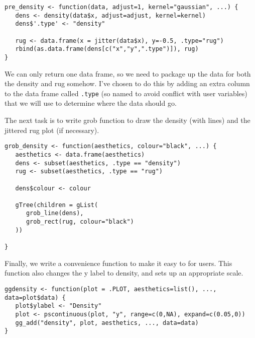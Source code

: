 \begin{verbatim}
pre_density <- function(data, adjust=1, kernel="gaussian", ...) {
   dens <- density(data$x, adjust=adjust, kernel=kernel)
   dens$'.type' <- "density"

   rug <- data.frame(x = jitter(data$x), y=-0.5, .type="rug")
   rbind(as.data.frame(dens[c("x","y",".type")]), rug)
}
\end{verbatim}

We can only return one data frame, so we need to package up the data for both the density and rug somehow.  I've chosen to do this by adding an extra column to the data frame called \texttt{.type} (so named to avoid conflict with user variables) that we will use to determine where the data should go.

The next task is to write grob function to draw the density (with lines) and the jittered rug plot (if necessary).

\begin{verbatim}
grob_density <- function(aesthetics, colour="black", ...) {
   aesthetics <- data.frame(aesthetics)
   dens <- subset(aesthetics, .type == "density")
   rug <- subset(aesthetics, .type == "rug")

   dens$colour <- colour

   gTree(children = gList(
      grob_line(dens),
      grob_rect(rug, colour="black")
   ))

}
\end{verbatim}

Finally, we write a convenience function to make it easy to for users.  This function also changes the y label to density, and sets up an appropriate scale.

\begin{verbatim}
ggdensity <- function(plot = .PLOT, aesthetics=list(), ..., data=plot$data) {
   plot$ylabel <- "Density"
   plot <- pscontinuous(plot, "y", range=c(0,NA), expand=c(0.05,0))
   gg_add("density", plot, aesthetics, ..., data=data)
}  
\end{verbatim}



